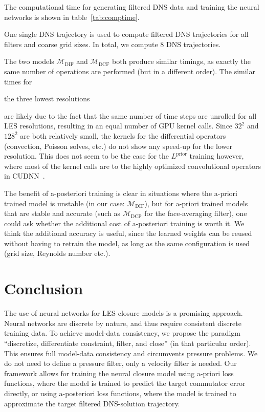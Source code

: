 \documentclass[preprint]{elsarticle}
\newcommand{\revboth}[1]{#1}
\begin{document}
The computational time for generating filtered DNS data and training the neural
networks is shown in table~\ref{tab:comptime}.
\revboth{
    
    One single DNS trajectory is used to compute filtered DNS trajectories 
    for all filters and coarse grid sizes. In total, we compute 8 DNS trajectories.
}
The two models $\mathcal{M}_{\text{DIF}}$ and $\mathcal{M}_{\text{DCF}}$
both produce similar timings, as exactly the same number of
operations are performed (but in a different order). The similar times for
\revboth{
    
    the three lowest resolutions
}
are likely due to the fact
that the same number of time steps are unrolled for all LES resolutions,
resulting in an equal number of GPU kernel calls. Since
\revboth{ $32^2$} and $128^2$ are both relatively small,
the kernels for the differential operators (convection, Poisson solves, etc.)
do not show any \revboth{ speed-up} for the lower resolution.
This does not seem to be the case for the $L^\text{prior}$ training however,
where most of the kernel calls are to the highly optimized convolutional
operators in CUDNN~\cite{Chetlur2014}.

The benefit of a-posteriori training is clear in situations where the a-priori
trained model is unstable (in our case: $\mathcal{M}_\text{DIF}$), but for a-priori
trained models that are stable and accurate
(such as $\mathcal{M}_\text{DCF}$ \revboth{for the face-averaging filter}),
one could ask whether the additional cost of a-posteriori training is worth it. We
think the additional accuracy is useful, since the learned weights can be reused
without having to retrain the model, as long as the same configuration is used
(grid size, Reynolds number etc.).

\section{Conclusion} \label{sec:conclusion}

The use of neural networks for LES closure models is a promising approach.
Neural networks are discrete by nature, and thus require consistent discrete
training data. To achieve model-data consistency, we propose the paradigm
``discretize, differentiate constraint, filter, and close'' (in that particular
order). This ensures full model-data consistency and circumvents pressure
problems. We do not need to define a pressure filter, only a velocity filter is
needed. Our framework allows for training the neural closure model using
a-priori loss functions, where the model is trained to predict the target
commutator error directly, or using a-posteriori loss functions, where the model
is trained to approximate the target filtered DNS-solution trajectory.
\end{document}
